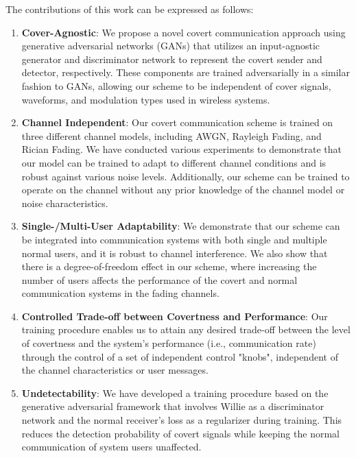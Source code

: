 The contributions of this work can be expressed as follows:
\begin{enumerate}
	\item \textbf{Cover-Agnostic}: We propose a novel covert communication approach using generative adversarial networks (GANs) that utilizes an input-agnostic generator and discriminator network to represent the covert sender and detector, respectively. These components are trained adversarially in a similar fashion to GANs, allowing our scheme to be independent of cover signals, waveforms, and modulation types used in wireless systems.
	\item \textbf{Channel Independent}: Our covert communication scheme is trained on three different channel models, including AWGN, Rayleigh Fading, and Rician Fading. We have conducted various experiments to demonstrate that our model can be trained to adapt to different channel conditions and is robust against various noise levels. Additionally, our scheme can be trained to operate on the channel without any prior knowledge of the channel model or noise characteristics.
	\item \textbf{Single-/Multi-User Adaptability}: We demonstrate that our scheme can be integrated into communication systems with both single and multiple normal users, and it is robust to channel interference. We also show that there is a degree-of-freedom effect in our scheme, where increasing the number of users affects the performance of the covert and normal communication systems in the fading channels.
	\item \textbf{Controlled Trade-off between Covertness and Performance}: Our training procedure enables us to attain any desired trade-off between the level of covertness and the system's performance (i.e., communication rate) through the control of a set of independent control "knobs", independent of the channel characteristics or user messages.
	\item \textbf{Undetectability}: We have developed a training procedure based on the generative adversarial framework that involves Willie as a discriminator network and the normal receiver's loss as a regularizer during training. This reduces the detection probability of covert signals while keeping the normal communication of system users unaffected.
\end{enumerate}
